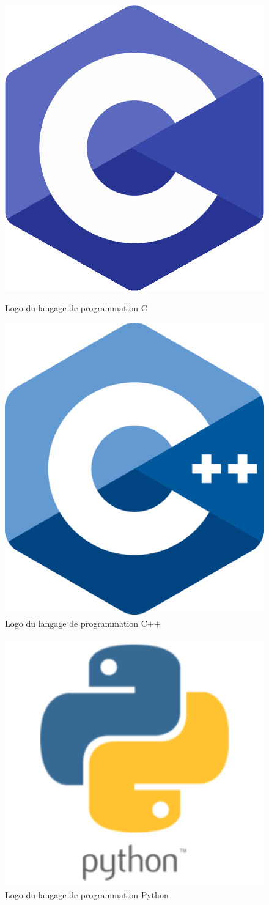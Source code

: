 \documentclass[12pt, a4paper]{report}
\begin{document}
\begin{figure}[H]
    \begin{minipage}{.5\textwidth}
        \centering
        \includegraphics[width=.5\textwidth]{c.png}
        \caption{Logo du langage de programmation C}
    \end{minipage}
    \begin{minipage}{.5\textwidth}
        \centering
        \includegraphics[width=.5\textwidth]{cpp.png}
        \caption{Logo du langage de programmation C++}
    \end{minipage}
\end{figure}
\begin{figure}[H]
    \centering
    \includegraphics[width=.35\textwidth]{python.png}
    \caption{Logo du langage de programmation Python}
\end{figure}
\end{document}
